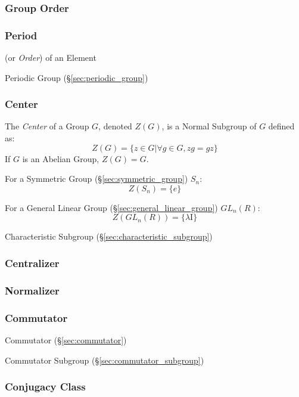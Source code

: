 \subsubsection{Group Order}\label{sec:group_order}

\subsubsection{Period}\label{sec:period}

(or \emph{Order}) of an Element

Periodic Group (\S\ref{sec:periodic_group})



\subsubsection{Center}\label{sec:group_center}

The \emph{Center} of a Group $G$, denoted $Z(G)$, is a Normal Subgroup of $G$
defined as:
\[
    Z(G) = \{ z \in G | \forall g \in G, zg = gz \}
\]
If $G$ is an Abelian Group, $Z(G) = G$.

For a Symmetric Group (\S\ref{sec:symmetric_group}) $S_n$:
\[
    Z(S_n) = \{e\}
\]

For a General Linear Group (\S\ref{sec:general_linear_group}) $GL_n(R)$:
\[
    Z(GL_n(R)) = \{\lambda \mathrm{I}\}
\]

Characteristic Subgroup (\S\ref{sec:characteristic_subgroup})



\subsubsection{Centralizer}\label{sec:group_centralizer}

\subsubsection{Normalizer}\label{sec:group_normalizer}

\subsubsection{Commutator}\label{sec:group_commutator}

Commutator (\S\ref{sec:commutator})

Commutator Subgroup (\S\ref{sec:commutator_subgroup})



\subsubsection{Conjugacy Class}\label{sec:conjugacy_class}

